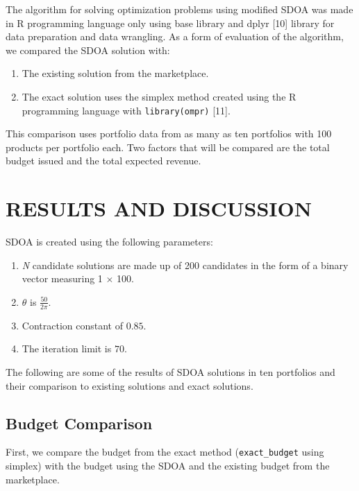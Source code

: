 \documentclass[
]{article}
\providecommand{\tightlist}{%
  \setlength{\itemsep}{0pt}\setlength{\parskip}{0pt}}
\begin{document}
The algorithm for solving optimization problems using modified SDOA was
made in R programming language only using base library and dplyr
{[}10{]} library for data preparation and data wrangling. As a form of
evaluation of the algorithm, we compared the SDOA solution with:

\begin{enumerate}
\def\labelenumi{\arabic{enumi}.}
\tightlist
\item
  The existing solution from the marketplace.
\item
  The exact solution uses the simplex method created using the R
  programming language with \texttt{library(ompr)} {[}11{]}.
\end{enumerate}

This comparison uses portfolio data from as many as ten portfolios with
100 products per portfolio each. Two factors that will be compared are
the total budget issued and the total expected revenue.

\hypertarget{results-and-discussion}{%
\section{RESULTS AND DISCUSSION}\label{results-and-discussion}}

SDOA is created using the following parameters:

\begin{enumerate}
\def\labelenumi{\arabic{enumi}.}
\tightlist
\item
  \emph{N} candidate solutions are made up of 200 candidates in the form
  of a binary vector measuring 1 \(\times\) 100.
\item
  \(\theta\) is \(\frac{50}{2 \pi}\).
\item
  Contraction constant of \(0.85\).
\item
  The iteration limit is \(70\).
\end{enumerate}

The following are some of the results of SDOA solutions in ten
portfolios and their comparison to existing solutions and exact
solutions.

\hypertarget{budget-comparison}{%
\subsection{Budget Comparison}\label{budget-comparison}}

First, we compare the budget from the exact method
(\texttt{exact\_budget} using simplex) with the budget using the SDOA
and the existing budget from the marketplace.
\end{document}
